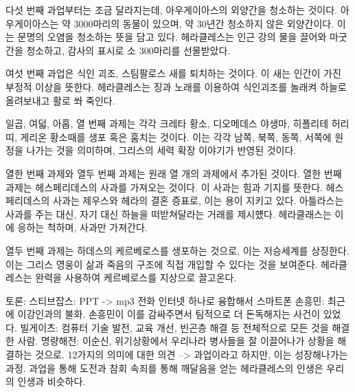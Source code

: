 다섯 번째 과업부터는 조금 달라지는데, 아우게이아스의 외양간을 청소하는 것이다.
아우게이아스는 약 3000마리의 동물이 있으며, 약 30년간 청소하지 않은 외양간이다.
이는 문명의 오염을 청소하는 뜻을 담고 있다. 헤라클레스는 인근 강의 물을 끌어와
마굿간을 청소하고, 감사의 표시로 소 300마리를 선물받았다.

여섯 번째 과업은 식인 괴조, 스팀팔로스 새를 퇴치하는 것이다. 이 새는 인간이 가진
부정적 이상을 뜻한다. 헤라클레스는 징과 노래를 이용하여 식인괴조를 놀래켜 하늘로
올려보내고 활로 쏴 죽인다.

일곱, 여덟, 아홉, 열 번째 과제는 각각 크레타 황소, 디오메데스 야생마, 히폴리테
허리띠, 게리온 황소때를 생포 혹은 훔치는 것이다. 이는 각각 남쪽, 북쪽, 동쪽,
서쪽에 원정을 나가는 것을 의미하며, 그리스의 세력 확장 이야기가 반영된 것이다.

열한 번째 과제와 열두 번째 과제는 원래 열 개의 과제에서 추가된 것이다. 열한 번째
과제는 헤스페리데스의 사과를 가져오는 것이다. 이 사과는 힘과 기지를 뜻한다.
헤스페리데스의 사과는 제우스와 헤라의 결혼 증표로, 이는 용이 지키고 있다. 
아틀라스는 사과를 주는 대신, 자기 대신 하늘을 떠받쳐달라는 거래를 제시헀다.
헤라클래스는 이에 응하는 척하며, 사과만 가져간다.

열두 번째 과제는 하데스의 케르베로스를 생포하는 것으로, 이는 저승세계를 상징한다.
이는 그리스 영웅이 삶과 죽음의 구조에 직접 개입할 수 있다는 것을 보여준다. 
헤라클레스는 완력을 사용하여 케르베로스를 지상으로 끌고온다.

토론:
스티브잡스: PPT -> mp3 전화 인터넷 하나로 융합해서 스마트폰
손흥민: 최근에 이강인과의 불화. 손흥민이 이를 감싸주면서 팀적으로 더 돈독해지는 사건이 있었다.
빌게이츠: 컴퓨터 기술 발전, 교육 개선, 빈곤층 해결 등 전체적으로 모든 것을 해결한 사람.
명량해전: 이순신, 위기상황에서 우리나라 병사들을 잘 이끌어나가 상황을 해결하는 것으로.
12가지의 의미에 대한 의견 --> 과업이라고 하지만, 이는 성장해나가는 과정. 과업을 통해 도전과 참회 속죄를 통해 깨달음을 얻는
헤라클레스의 인생은 우리의 인생과 비슷하다.

